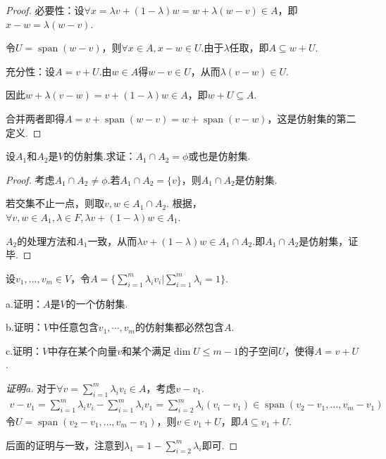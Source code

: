 \begin{proof}
    必要性：设\(\forall x=\lambda v+(1-\lambda)w=w+\lambda(w-v) \in A\)，即\(x-w=\lambda(w-v)\).

    令\(U=\operatorname{span}(w-v)\)，则\(\forall x \in A,x-w \in U\).由于\(\lambda\)任取，即\(A \subseteq w+U\).

    充分性：设\(A=v+U\).由\(w \in A\)得\(w-v \in U\)，从而\(\lambda(v-w) \in U\).

    因此\(w+\lambda(v-w)=v+(1-\lambda)w \in A\)，即\(w+U \subseteq A\).

    合并两者即得\(A=v+\operatorname{span}(w-v)=w+\operatorname{span}(v-w)\)，{\kaishu 这是仿射集的第二定义.}
\end{proof}

\begin{problem}[9]\label{3.E.9}
    设\(A_1\)和\(A_2\)是\(V\)的仿射集.求证：\(A_1 \cap A_2=\phi\)或也是仿射集.
\end{problem}

\begin{proof}
    考虑\(A_1 \cap A_2 \ne \phi\).若\(A_1 \cap A_2=\{v\}\)，则\(A_1 \cap A_2\)是仿射集.

    若交集不止一点，则取\(v,w \in A_1 \cap A_2\).
    根据，\(\forall v,w \in A_1,\lambda \in F,\lambda v+(1-\lambda)w \in A_1\).

    \(A_2\)的处理方法和\(A_1\)一致，从而\(\lambda v+(1- \lambda)w \in A_1 \cap A_2\).即\(A_1 \cap A_2\)是仿射集，证毕.
\end{proof}

\newpage

\begin{problem}[11]\label{3.E.11}
    设\(v_1, \dots,v_m \in V\)，令\(A=\{\sum_{i=1}^m \lambda_i v_i|\sum_{i=1}^m \lambda_i=1\}\).

    a.证明：\(A\)是\(V\)的一个仿射集.

    b.证明：\(V\)中任意包含\(v_1,\cdots,v_m\)的仿射集都必然包含\(A\).

    c.证明：\(V\)中存在某个向量\(v\)和某个满足\(\dim U \leq m-1\)的子空间\(U\)，使得\(A=v+U\).
\end{problem}

\begin{proof}[证明a]
    对于\(\forall v=\sum_{i=1}^m \lambda_i v_i \in A\)，考虑\(v-v_1\).
    \begin{align*}
        v-v_1=\sum_{i=1}^m \lambda_i v_i-\sum_{i=1}^m \lambda_i v_1=\sum_{i=2}^m \lambda_i(v_i-v_1) 
        \in \operatorname{span}(v_2-v_1, \dots, v_m-v_1)
    \end{align*}
    令\(U=\operatorname{span}(v_2-v_1, \dots, v_m-v_1)\)，则\(v \in v_1+U\)，即\(A \subseteq v_1+U\).

    后面的证明与一致，注意到\(\lambda_1=1-\sum_{i=2}^m \lambda_i\)即可.
\end{proof}

